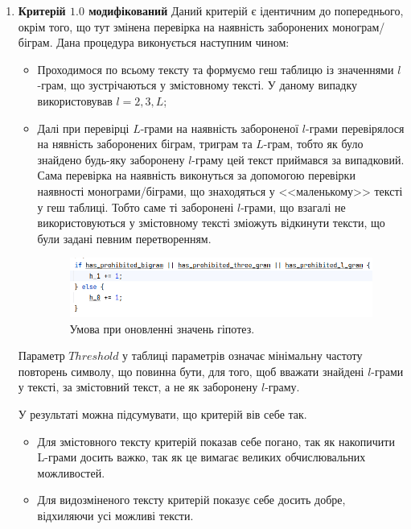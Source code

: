 \begin{enumerate}
    
    \item \textbf{Критерій $1.0$ модифікований}
        Даний критерій є ідентичним до попереднього, окрім того, що тут змінена перевірка на наявність заборонених монограм/біграм. Дана процедура виконується наступним чином:
        \begin{itemize}
            \item Проходимося по всьому тексту та формуємо геш таблицю із значеннями $l$-грам, що зустрічаються у змістовному тексті. У даному випадку використовував $l = 2, 3, L$;
            \item Далі при перевірці $L$-грами на наявність забороненої $l$-грами перевірялося на нявність заборонених біграм, триграм та $L$-грам, тобто як було знайдено будь-яку заборонену $l$-граму цей текст приймався за випадковий. Сама перевірка на наявність виконуться за допомогою перевірки наявності монограми/біграми, що знаходяться у <<маленькому>> тексті у геш таблиці. Тобто саме ті заборонені $l$-грами, що взагалі не використовуються у змістовному тексті зміожуть відкинути тексти, що були задані певним перетворенням. 
        
        \begin{figure}[!h]
            \centering
            \includegraphics[width=0.5\linewidth]{Images/prh_grams_condition.png}
            \caption{Умова при оновленні значень гіпотез.}
            \label{fig:enter-label}
        \end{figure}
        \end{itemize}

        Параметр $Threshold$ у таблиці параметрів означає мінімальну частоту повторень символу, що повинна бути, для того, щоб вважати знайдені $l$-грами у тексті, за змістовний текст, а не як заборонену $l$-граму. 

        У результаті можна підсумувати, що критерій вів себе так.
        \begin{itemize}
            \item Для змістовного тексту критерій показав себе погано, так як накопичити L-грами досить важко, так як це вимагає великих обчислювальних можливостей. 
            \item Для видозміненого тексту критерій показує себе досить добре, відхиляючи усі можливі тексти. 
        \end{itemize}


\end{enumerate}
